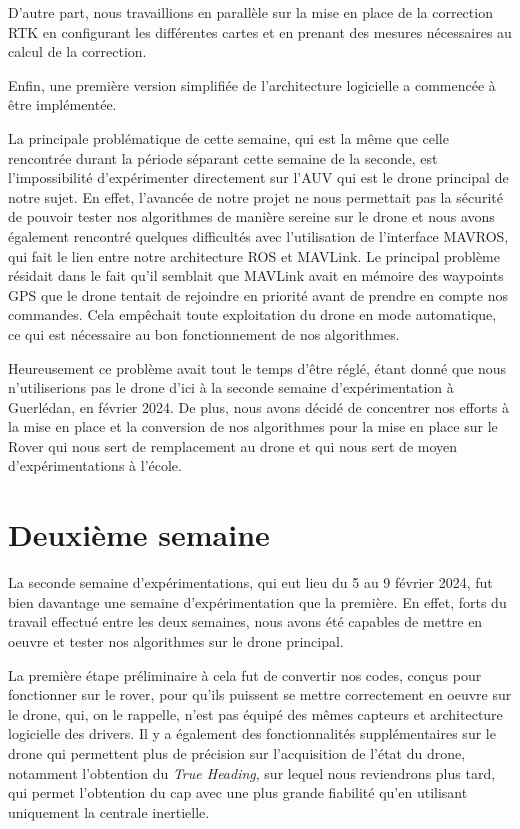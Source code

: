 \documentclass[12pt]{report}
\begin{document}
D'autre part, nous travaillions en parallèle sur la mise en place de la correction RTK en configurant les différentes cartes et en prenant des mesures nécessaires au calcul de la correction. 

Enfin, une première version simplifiée de l'architecture logicielle a commencée à être implémentée. 


La principale problématique de cette semaine, qui est la même que celle rencontrée durant la période séparant cette semaine de la seconde, est l'impossibilité d'expérimenter directement sur l'AUV qui 
est le drone principal de notre sujet. En effet, l'avancée de notre projet ne nous permettait pas la sécurité de pouvoir tester nos algorithmes de manière sereine sur le drone et nous avons également 
rencontré quelques difficultés avec l'utilisation de l'interface MAVROS, qui fait le lien entre notre architecture ROS et MAVLink. Le principal problème résidait dans le fait qu'il semblait que MAVLink 
avait en mémoire des waypoints GPS que le drone tentait de rejoindre en priorité avant de prendre en compte nos commandes. Cela empêchait toute exploitation du drone en mode automatique, ce qui est nécessaire
au bon fonctionnement de nos algorithmes.

Heureusement ce problème avait tout le temps d'être réglé, étant donné que nous n'utiliserions pas le drone d'ici à la seconde semaine d'expérimentation à Guerlédan, en février 2024. De plus, nous avons 
décidé de concentrer nos efforts à la mise en place et la conversion de nos algorithmes pour la mise en place sur le Rover qui nous sert de remplacement au drone et qui nous sert de moyen d'expérimentations à l'école. 


\section{Deuxième semaine}

La seconde semaine d'expérimentations, qui eut lieu du 5 au 9 février 2024, fut bien davantage une semaine d'expérimentation que la première. 
En effet, forts du travail effectué entre les deux semaines, nous avons été capables de mettre en oeuvre et tester nos algorithmes sur le drone principal.

La première étape préliminaire à cela fut de convertir nos codes, conçus pour fonctionner sur le rover, pour qu'ils puissent se mettre correctement en oeuvre sur le drone, qui, on le rappelle, n'est pas
équipé des mêmes capteurs et architecture logicielle des drivers. Il y a également des fonctionnalités supplémentaires sur le drone qui permettent plus de précision sur l'acquisition de l'état du drone, notamment 
l'obtention du \textit{True Heading}, sur lequel nous reviendrons plus tard, qui permet l'obtention du cap avec une plus grande fiabilité qu'en utilisant uniquement la centrale inertielle. 
\end{document}
